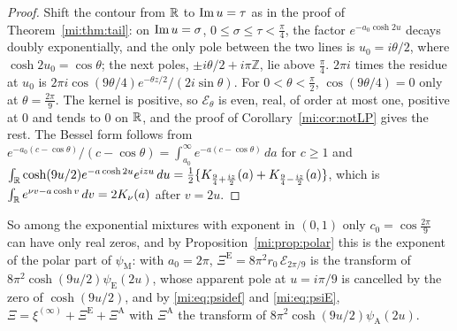 \begin{proof}
Shift the contour from $\mathbb{R}$ to $\operatorname{Im} u=\tau$ as in the proof of Theorem~\ref{mi:thm:tail}: on $\operatorname{Im} u=\sigma$, $0\le\sigma\le\tau<\frac\pi4$, the factor $e^{-a_0\cosh2u}$ decays doubly exponentially, and the only pole between the two lines is $u_0=i\theta/2$, where $\cosh2u_0=\cos\theta$; the next poles, $\pm i\theta/2+i\pi\mathbb Z$, lie above $\frac\pi4$. $2\pi i$ times the residue at $u_0$ is $2\pi i\cos(9\theta/4)e^{-\theta z/2}/(2i\sin\theta)$. For $0<\theta<\frac\pi2$, $\cos(9\theta/4)=0$ only at $\theta=\frac{2\pi}9$. The kernel is positive, so $\mathcal E_\theta$ is even, real, of order at most one, positive at $0$ and tends to $0$ on $\mathbb{R}$, and the proof of Corollary~\ref{mi:cor:notLP} gives the rest. The Bessel form follows from $e^{-a_0(c-\cos\theta)}/(c-\cos\theta)=\int_{a_0}^\infty e^{-a(c-\cos\theta)}\,da$ for $c\ge1$ and $\int_{\mathbb{R}}\cosh(9u/2)e^{-a\cosh2u}e^{izu}\,du=\frac12\{K_{\frac94+\frac{iz}2}(a)+K_{\frac94-\frac{iz}2}(a)\}$, which is $\int_{\mathbb{R}} e^{\nu v-a\cosh v}\,dv=2K_\nu(a)$ after $v=2u$.
\end{proof}

So among the exponential mixtures with exponent in $(0,1)$ only $c_0=\cos\frac{2\pi}9$ can have only real zeros, and by Proposition~\ref{mi:prop:polar} this is the exponent of the polar part of $\psi_{\mathrm M}$: with $a_0=2\pi$, $\Xi^{\mathrm E}=8\pi^2r_0\,\mathcal E_{2\pi/9}$ is the transform of $8\pi^2\cosh(9u/2)\psi_{\mathrm E}(2u)$, whose apparent pole at $u=i\pi/9$ is cancelled by the zero of $\cosh(9u/2)$, and by \eqref{mi:eq:psidef} and \eqref{mi:eq:psiE}, $\Xi=\xi^{(\infty)}+\Xi^{\mathrm E}+\Xi^{\mathrm A}$ with $\Xi^{\mathrm A}$ the transform of $8\pi^2\cosh(9u/2)\psi_{\mathrm A}(2u)$.

